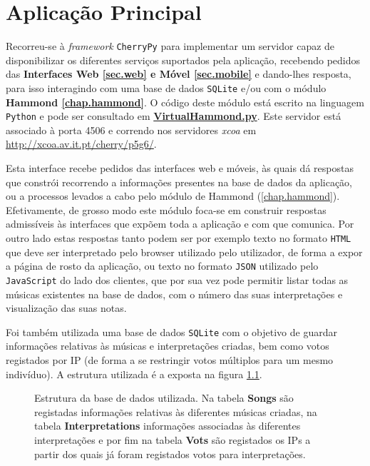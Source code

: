 \documentclass[a4paper,11pt,openright,oneside]{report}
\begin{document}
\chapter{Aplicação Principal}
\label{chap.mainapp}

Recorreu-se à \textit{framework} \verb|CherryPy| para implementar um servidor capaz de disponibilizar os diferentes serviços suportados pela aplicação, recebendo pedidos das \textbf{Interfaces Web \ref{sec.web} e Móvel \ref{sec.mobile}} e dando-lhes resposta, para isso interagindo com uma base de dados \verb|SQLite| e/ou com o módulo \textbf{Hammond \ref{chap.hammond}}. O código deste módulo está escrito na linguagem \verb|Python| e pode ser consultado em \href{../../MainApp/VirtualHammond.py}{\textbf{VirtualHammond.py}}. Este servidor está associado à porta 4506 e correndo nos servidores \textit{xcoa} em \url{http://xcoa.av.it.pt/cherry/p5g6/}.

Esta interface recebe pedidos das interfaces web e móveis, às quais dá respostas que constrói recorrendo a informações presentes na base de dados da aplicação, ou a processos levados a cabo pelo módulo de Hammond (\ref{chap.hammond}). Efetivamente, de grosso modo este módulo foca-se em construir respostas admissíveis às interfaces que expõem toda a aplicação e com que comunica. Por outro lado estas respostas tanto podem ser por exemplo texto no formato \verb|HTML| que deve ser interpretado pelo browser utilizado pelo utilizador, de forma a expor a página de rosto da aplicação, ou texto no formato \verb|JSON| utilizado pelo \verb|JavaScript| do lado dos clientes, que por sua vez pode permitir listar todas as músicas existentes na base de dados, com o número das suas interpretações e visualização das suas notas.

Foi também utilizada uma base de dados \verb|SQLite| com o objetivo de guardar informações relativas às músicas e interpretações criadas, bem como votos registados por IP (de forma a se restringir votos múltiplos para um mesmo indivíduo). A estrutura utilizada é a exposta na figura \ref{fig:sr1}.

\begin{figure}[ht]	
\center
{}
\caption{Estrutura da base de dados utilizada. Na tabela \textbf{Songs} são registadas informações relativas às diferentes músicas criadas, na tabela \textbf{Interpretations} informações associadas às diferentes interpretações e por fim na tabela \textbf{Vots} são registados os IPs a partir dos quais já foram registados votos para interpretações.}
\label{fig:sr1}
\end{figure}
\end{document}
